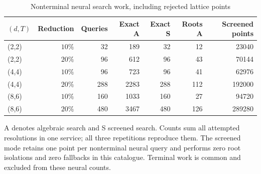 \begin{table}[htbp]\centering
\caption{Nonterminal neural search work, including rejected lattice points}\label{tab:search-operations59}
{\small\setlength{\tabcolsep}{3pt}\begin{tabular}{lrrrrrr}
\hline
$(d,T)$ & Reduction & Queries & Exact A & Exact S & Roots A & Screened points \\
\hline
(2,2) & $10\%$ & 32 & 189 & 32 & 12 & 23040 \\
(2,2) & $20\%$ & 96 & 612 & 96 & 43 & 70144 \\
(4,4) & $10\%$ & 96 & 723 & 96 & 41 & 62976 \\
(4,4) & $20\%$ & 288 & 2283 & 288 & 112 & 192000 \\
(8,6) & $10\%$ & 160 & 1033 & 160 & 27 & 94720 \\
(8,6) & $20\%$ & 480 & 3467 & 480 & 126 & 289280 \\
\hline\end{tabular}}\par\smallskip
{\footnotesize A denotes algebraic search and S screened search. Counts sum all attempted resolutions in one service; all three repetitions reproduce them. The screened mode retains one point per nonterminal neural query and performs zero root isolations and zero fallbacks in this catalogue. Terminal work is common and excluded from these neural counts.}
\end{table}

